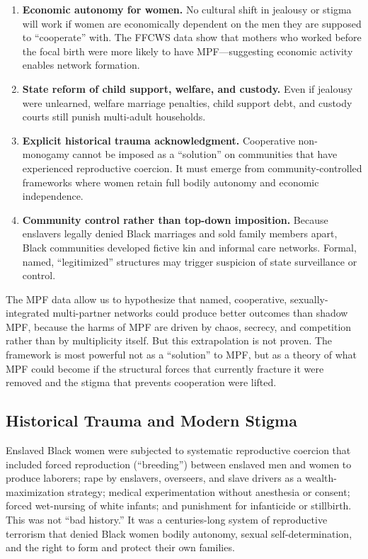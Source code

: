 \begin{enumerate}
  \item \textbf{Economic autonomy for women.} No cultural shift in jealousy or stigma will work if women are economically dependent on the men they are supposed to ``cooperate'' with. The FFCWS data show that mothers who worked before the focal birth were more likely to have MPF---suggesting economic activity enables network formation.
  
  \item \textbf{State reform of child support, welfare, and custody.} Even if jealousy were unlearned, welfare marriage penalties, child support debt, and custody courts still punish multi-adult households.
  
  \item \textbf{Explicit historical trauma acknowledgment.} Cooperative non-monogamy cannot be imposed as a ``solution'' on communities that have experienced reproductive coercion. It must emerge from community-controlled frameworks where women retain full bodily autonomy and economic independence.
  
  \item \textbf{Community control rather than top-down imposition.} Because enslavers legally denied Black marriages and sold family members apart, Black communities developed fictive kin and informal care networks. Formal, named, ``legitimized'' structures may trigger suspicion of state surveillance or control.
\end{enumerate}

The MPF data allow us to hypothesize that named, cooperative, sexually-integrated multi-partner networks could produce better outcomes than shadow MPF, because the harms of MPF are driven by chaos, secrecy, and competition rather than by multiplicity itself. But this extrapolation is not proven. The framework is most powerful not as a ``solution'' to MPF, but as a theory of what MPF could become if the structural forces that currently fracture it were removed and the stigma that prevents cooperation were lifted.

\subsection{Historical Trauma and Modern Stigma}

Enslaved Black women were subjected to systematic reproductive coercion that included forced reproduction (``breeding'') between enslaved men and women to produce laborers; rape by enslavers, overseers, and slave drivers as a wealth-maximization strategy; medical experimentation without anesthesia or consent; forced wet-nursing of white infants; and punishment for infanticide or stillbirth. This was not ``bad history.'' It was a centuries-long system of reproductive terrorism that denied Black women bodily autonomy, sexual self-determination, and the right to form and protect their own families.

